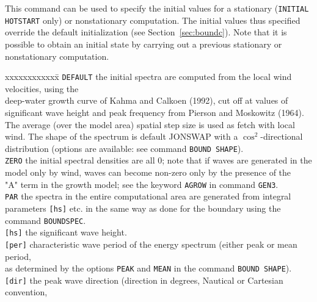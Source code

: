 \documentclass[12pt]{book}
\begin{document}
\noindent
This command can be used to specify the initial values for a stationary ({\tt INITIAL HOTSTART} only) or nonstationary computation.
The initial values thus specified override the default initialization (see Section~\ref{sec:boundc}). Note that it is possible to
obtain an initial state by carrying out a previous stationary or nonstationary computation.
\begin{tabbing}
xxxxxxxxxxxx\= \kill
{\tt DEFAULT}     \> the initial spectra are computed from the local wind velocities, using the\+\\
                     deep-water growth curve of Kahma and Calkoen (1992), cut off at values of\\
                     significant wave height and peak frequency from Pierson and Moskowitz (1964).\\
                     The average (over the model area) spatial step size is used as fetch with local\\
                     wind. The shape of the spectrum is default JONSWAP with a $\cos^2$-directional\\
                     distribution (options are available: see command {\tt BOUND SHAPE}).\-\\
{\tt ZERO}        \> the initial spectral densities are all 0; note that if waves are generated in the\+\\
                     model only by wind, waves can become non-zero only by the presence of the\\
                     "A" term in the growth model; see the keyword {\tt AGROW} in command {\tt GEN3}.\-\\
{\tt PAR}         \> the spectra in the entire computational area are generated from integral\+\\
                     parameters {\tt [hs]} etc. in the same way as done for the boundary using the\\
                     command {\tt BOUNDSPEC}.\-\\
{\tt [hs]}        \> the significant wave height.\\
{\tt [per]}       \> characteristic wave period of the energy spectrum (either peak or mean period,\+\\
                     as determined by the options {\tt PEAK} and {\tt MEAN} in the command {\tt BOUND SHAPE}).\-\\
{\tt [dir]}       \> the peak wave direction (direction in degrees, Nautical or Cartesian convention,\+\\

\end{tabbing}
\end{document}
